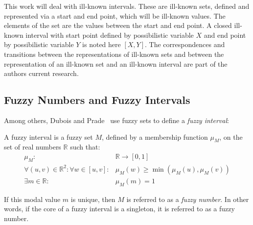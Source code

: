 This work will deal with ill-known intervals. These are ill-known sets, defined and represented via a start and end point, which will be ill-known values. The elements of the set are the values between the start and end point. A closed ill-known interval with start point defined by possibilistic variable $X$ and end point by possibilistic variable $Y$ is noted here $\left[X, Y\right]$. The correspondences and transitions between the representations of ill-known sets and between the representation of an ill-known set and an ill-known interval are part of the authors current research.

\subsection{\label{subsec:fuzzy-numbers}Fuzzy Numbers and Fuzzy Intervals}
Among others, Dubois and Prade~\cite{Dubois1983} use fuzzy sets\cite{zadeh65} to define a \emph{fuzzy interval}:
\begin{definition}
A fuzzy interval is a fuzzy set $M$, defined by a membership function $\mu_{M}$, on the set of real numbers $\mathbb{R}$ such that:
\begin{eqnarray}
\mu_{M} : & \!\!\!\!\!\!\!\!\!\!\!\!\!\!\!\!\!\!\!\!\!\!\!\!\!\!\!\!\!\!\!\!\!\!\!\!\!\!\!\!\!\!\!\!\!\!\!\!\!\! \mathbb{R} \rightarrow \left[0,1\right] \nonumber \\ 
\forall (u,v)\in\mathbb{R}^2: \forall w \in [u,v]:&\mu_M(w) \geq\min(\mu_M(u),\mu_M(v))  \\
\exists m \in \mathbb{R} : & \!\!\!\!\!\!\!\!\!\!\!\!\!\!\!\!\!\!\!\!\!\!\!\!\!\!\!\!\!\!\!\!\!\!\!\!\!\!\!\!\!\!\!\!\!\!\!\! \mu_M(m)=1 
\end{eqnarray}
\end{definition}
If this modal value $m$ is unique, then $M$ is referred to as a \emph{fuzzy number}. In other words, if the core of a fuzzy interval is a singleton, it is referred to as a fuzzy number.


